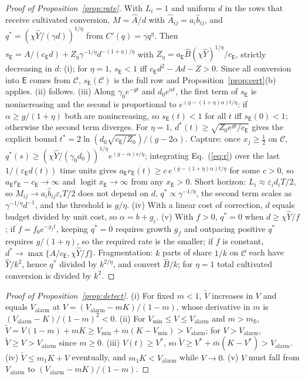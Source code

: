 \documentclass[letterpaper]{article} %
\theoremstyle{definition}
\newcommand{\dE}{\mathsf{E}}
\newcommand{\cC}{\mathcal{C}}
\newcommand{\Valarm}{V_{\mathrm{alarm}}}
\newcommand{\Vmin}{V_{\min}}
\newcommand{\mfl}{m_{\mathrm{fl}}}
\begin{document}
\begin{proof}[Proof of Proposition~\ref{prop:rate}]
With $L_i=1$ and uniform $d$ in the rows that receive cultivated conversion, $M=\hat A/d$ with $\hat A_{ij}=a_i\hat b_{ij}$, and $q^\ast=(\chi\hat Y/(\gamma d))^{1/\eta}$ from $C'(q)=\gamma q^\eta$. Then $s_\dE=A/(c_\dE d)+Z_\eta\gamma^{-1/\eta}d^{-(1+\eta)/\eta}$ with $Z_\eta=a_\dE\hat B(\chi\hat Y)^{1/\eta}/c_\dE$, strictly decreasing in $d$: (i); for $\eta=1$, $s_\dE<1$ iff $c_\dE d^2-Ad-Z>0$. Since all conversion into $\dE$ comes from $\cC$, $s_\dE(\cC)$ is the full row and Proposition~\ref{prop:cert}(b) applies. (ii) follows. (iii) Along $\gamma_0e^{-gt}$ and $d_0e^{\alpha t}$, the first term of $s_\dE$ is nonincreasing and the second is proportional to $e^{(g-(1+\eta)\alpha)t/\eta}$: if $\alpha\ge g/(1+\eta)$ both are nonincreasing, so $s_\dE(t)<1$ for all $t$ iff $s_\dE(0)<1$; otherwise the second term diverges. For $\eta=1$, $d^\ast(t)\ge\sqrt{Z_0e^{gt}/c_\dE}$ gives the explicit bound $t^\ast=2\ln(d_0\sqrt{c_\dE/Z_0})/(g-2\alpha)$. Capture: once $x_j\ge\frac12$ on $\cC$, $q^\ast(s)\ge(\chi\hat Y/(\gamma_0d_0))^{1/\eta}e^{(g-\alpha)s/\eta}$; integrating Eq.~(\ref{eq:r}) over the last $1/(\varepsilon_\dE d(t))$ time units gives $a_\dE r_\dE(t)\ge c\,e^{(g-(1+\eta)\alpha)t/\eta}$ for some $c>0$, so $a_\dE r_\dE-c_\dE\to\infty$ and $\operatorname{logit}x_\dE\to\infty$ from any $x_\dE>0$. Short horizon: $L_i\approx\varepsilon_id_iT/2$, so $M_{ij}\to a_i\hat b_{ij}\varepsilon_iT/2$ does not depend on $d$, $q^\ast\propto\gamma^{-1/\eta}$, the second term scales as $\gamma^{-1/\eta}d^{-1}$, and the threshold is $g/\eta$. (iv) With a linear cost of correction, $d$ equals budget divided by unit cost, so $\alpha=b+g_c$. (v) With $f>0$, $q^\ast=0$ when $d\ge\chi\hat Y/f$; if $f=f_0e^{-g_ft}$, keeping $q^\ast=0$ requires growth $g_f$ and outpacing positive $q^\ast$ requires $g/(1+\eta)$, so the required rate is the smaller; if $f$ is constant, $d^\ast\to\max\{A/c_\dE,\chi\hat Y/f\}$. Fragmentation: $k$ parts of share $1/k$ on $\cC$ each have $\hat Y/k^2$, hence $q^\ast$ divided by $k^{2/\eta}$, and convert $\hat B/k$; for $\eta=1$ total cultivated conversion is divided by $k^2$.
\end{proof}

\begin{proof}[Proof of Proposition~\ref{prop:detect}]
(i) For fixed $m<1$, $\tilde V$ increases in $V$ and equals $\Valarm$ at $V=(\Valarm-mK)/(1-m)$, whose derivative in $m$ is $(\Valarm-K)/(1-m)^2<0$. (ii) For $\Vmin\le V\le\Valarm$ and $m>\mfl$, $\tilde V=V(1-m)+mK\ge\Vmin+m(K-\Vmin)>\Valarm$; for $V>\Valarm$, $\tilde V\ge V>\Valarm$ since $m\ge0$. (iii) $V(t)\ge V^\ast$, so $\tilde V\ge V^\ast+\bar m(K-V^\ast)>\Valarm$. (iv) $\tilde V\le m_1K+V$ eventually, and $m_1K<\Valarm$ while $V\to0$. (v) $V$ must fall from $\Valarm$ to $(\Valarm-mK)/(1-m)$.
\end{proof}
\end{document}
